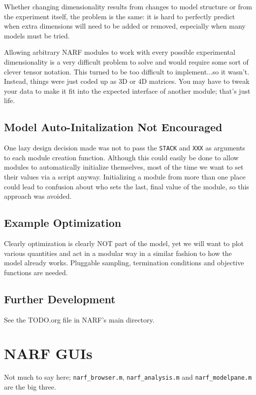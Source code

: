 \documentclass[letterpaper]{report}
\newcommand{\matlab}[1]{\texttt{#1}}
\begin{document}
Whether changing dimensionality results from changes to model structure or from the experiment itself, the problem is the same: it is hard to perfectly predict when extra dimensions will need to be added or removed, especially when many models must be tried.

Allowing arbitrary NARF modules to work with every possible experimental dimensionality is a very difficult problem to solve and would require some sort of clever tensor notation. This turned to be too difficult to implement...so it wasn't. Instead, things were just coded up as 3D or 4D matrices. You may have to tweak your data to make it fit into the expected interface of another module; that's just life. 

\section{Model Auto-Initalization Not Encouraged}

One lazy design decision made was not to pass the \matlab{STACK} and \matlab{XXX} as arguments to each module creation function. Although this could easily be done to allow modules to automatically initialize themselves, most of the time we want to set their values via a script anyway. Initializing a module from more than one place could lead to confusion about who sets the last, final value of the module, so this approach was avoided.

\section{Example Optimization}

Clearly optimization is clearly NOT part of the model, yet we will want to plot various quantities and act in a modular way in a similar fashion to how the model already works. Pluggable sampling, termination conditions and objective functions are needed. 

\section{Further Development}

See the TODO.org file in NARF's main directory.

\chapter{NARF GUIs}

Not much to say here; \matlab{narf\_browser.m}, \matlab{narf\_analysis.m} and \matlab{narf\_modelpane.m} are the big three. 
\end{document}
